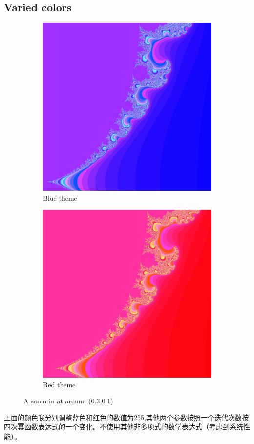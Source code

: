 \documentclass{ctexart}
\begin{document}
\subsection{Varied colors}
\begin{figure}[H]

\begin{subfigure}{0.5\textwidth}
	\centering
	\includegraphics[width=0.9\linewidth]{blue.jpg}
	\caption{Blue theme}
\end{subfigure}
\begin{subfigure}{0.5\textwidth}
	\centering
	\includegraphics[width=0.9\linewidth]{red1.jpg}
	\caption{Red theme}
\end{subfigure}
\caption{A zoom-in at around (0.3,0.1)}
\end{figure}
上面的颜色我分别调整蓝色和红色的数值为255,其他两个参数按照一个迭代次数按四次幂函数表达式的一个变化。不使用其他非多项式的数学表达式（考虑到系统性能）。
\end{document}
